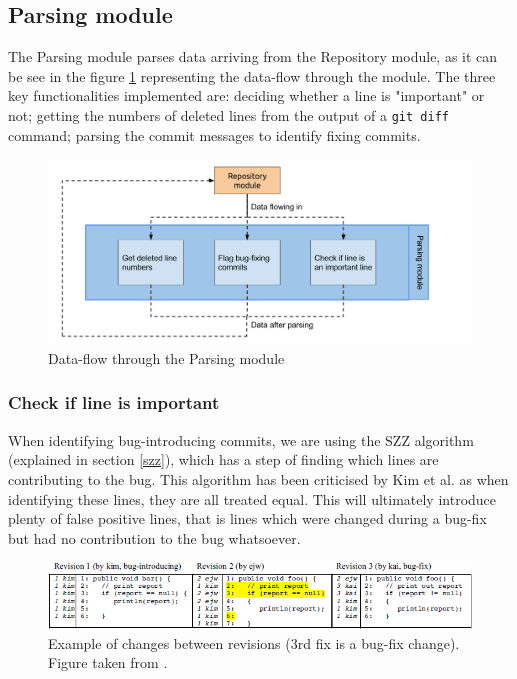\documentclass[12pt,twoside,notitlepage]{report}
\begin{document}
\subsection{Parsing module}\label{parsing}
The Parsing module parses data arriving from the Repository module, as it can be see in the figure \ref{parsing_module} representing the data-flow through the module. The three key functionalities implemented are: deciding whether a line is "important" or not; getting the numbers of deleted lines from the output of a \texttt{git diff} command; parsing the commit messages to identify fixing commits. 
\begin{figure}[h]
\includegraphics[width=1.0\textwidth]{parsing_module.png}
\caption{Data-flow through the Parsing module}

\label{parsing_module}
\end{figure}
\subsubsection*{Check if line is important}
When identifying bug-introducing commits, we are using the SZZ algorithm\cite{SZZ} (explained in section \ref{szz}), which has a step of finding which lines are contributing to the bug. This algorithm has been criticised by Kim et al.\cite{KimZim} as when identifying these lines, they are all treated equal. This will ultimately introduce plenty of false positive lines, that is lines which were changed during a bug-fix but had no contribution to the bug whatsoever.
\begin{figure}[h]
\includegraphics[width=1.0\textwidth]{automatic_identification.jpg}
\caption{Example of changes between revisions (3rd fix is a bug-fix change). Figure taken from \cite{KimZim}.}
\label{automatic_identification}
\end{figure}
\end{document}
